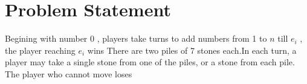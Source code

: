 \documentclass[a4paper,12pt]{article}
\begin{document}
 \section*{Problem Statement}
 Begining with number $0$ ,
  players take turns to add numbers from 1 to $n$ till $e_i$ ,
  the player reaching $e_i$ wins
 \smallskip
 There are two piles of 7 stones each.In each turn,
 a player may take a single stone from one of the piles,
 or a stone from each pile. The player who cannot move loses
 
\end{document}
